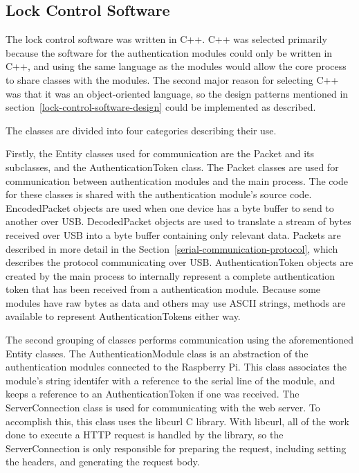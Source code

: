 \documentclass[12pt]{report}
\let\Oldsubsection\subsection
\renewcommand{\subsection}{\FloatBarrier\Oldsubsection}
\begin{document}
\subsection{Lock Control Software} \label{lock-control-software}

The lock control software was written in C++. C++ was selected primarily because the software for the authentication 
modules could only be written in C++, and using the same language as the modules would allow the core process to share 
classes with the modules. The second major reason for selecting C++ was that it was an object-oriented language, so the 
design patterns mentioned in section~\ref{lock-control-software-design} could be implemented as described.


The classes are divided into four categories describing their use.

Firstly, the Entity classes used for communication are the Packet and its subclasses, and the AuthenticationToken 
class. The Packet classes are used for communication between authentication modules and the main process. The code for 
these classes is shared with the authentication module's source code. EncodedPacket objects are used when one device 
has a byte buffer to send to another over USB. DecodedPacket objects are used to translate a stream of bytes received 
over USB into a byte buffer containing only relevant data. Packets are described in more detail in the 
Section~\ref{serial-communication-protocol}, which describes the protocol communicating over USB. AuthenticationToken 
objects are created by the main process to internally represent a complete authentication token that has been received 
from a authentication module. Because some modules have raw bytes as data and others may use ASCII strings, methods are 
available to represent AuthenticationTokens either way.

The second grouping of classes performs communication using the aforementioned Entity classes. The AuthenticationModule 
class is an abstraction of the authentication modules connected to the Raspberry Pi. This class associates the module's 
string identifer with a reference to the serial line of the module, and keeps a reference to an AuthenticationToken if 
one was received. The ServerConnection class is used for communicating with the web server. To accomplish this, this 
class uses the libcurl C library. With libcurl, all of the work done to execute a HTTP request is handled by the 
library, so the ServerConnection is only responsible for preparing the request, including setting the headers, and 
generating the request body.
\end{document}

